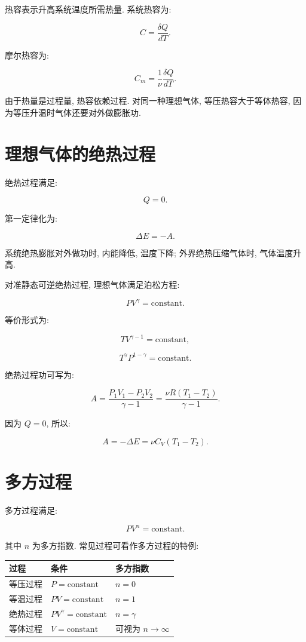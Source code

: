 \documentclass[
  a4paper,
]{ctexrep}
\begin{document}
热容表示升高系统温度所需热量. 系统热容为:

\[
C=\frac{\delta Q}{dT}.
\]

摩尔热容为:

\[
C_m=\frac{1}{\nu}\frac{\delta Q}{dT}.
\]

由于热量是过程量, 热容依赖过程. 对同一种理想气体, 等压热容大于等体热容,
因为等压升温时气体还要对外做膨胀功.

\section{理想气体的绝热过程}\label{ux7406ux60f3ux6c14ux4f53ux7684ux7eddux70edux8fc7ux7a0b}

绝热过程满足:

\[
Q=0.
\]

第一定律化为:

\[
\Delta E=-A.
\]

系统绝热膨胀对外做功时, 内能降低, 温度下降; 外界绝热压缩气体时,
气体温度升高.

对准静态可逆绝热过程, 理想气体满足泊松方程:

\[
PV^\gamma=\mathrm{constant}.
\]

等价形式为:

\[
TV^{\gamma-1}=\mathrm{constant},
\]

\[
T^\gamma P^{1-\gamma}=\mathrm{constant}.
\]

绝热过程功可写为:

\[
A=\frac{P_1V_1-P_2V_2}{\gamma-1}
=\frac{\nu R(T_1-T_2)}{\gamma-1}.
\]

因为 \(Q=0\), 所以:

\[
A=-\Delta E=\nu C_V(T_1-T_2).
\]

\section{多方过程}\label{ux591aux65b9ux8fc7ux7a0b}

多方过程满足:

\[
PV^n=\mathrm{constant}.
\]

其中 \(n\) 为多方指数. 常见过程可看作多方过程的特例:

\begin{longtable}[]{@{}lll@{}}
\toprule\noalign{}
过程 & 条件 & 多方指数 \\
\midrule\noalign{}
\endhead
\bottomrule\noalign{}
\endlastfoot
等压过程 & \(P=\mathrm{constant}\) & \(n=0\) \\
等温过程 & \(PV=\mathrm{constant}\) & \(n=1\) \\
绝热过程 & \(PV^\gamma=\mathrm{constant}\) & \(n=\gamma\) \\
等体过程 & \(V=\mathrm{constant}\) & 可视为 \(n\to\infty\) \\
\end{longtable}
\end{document}
